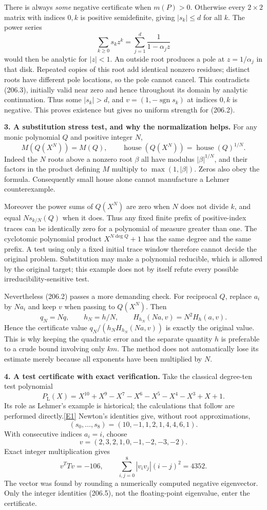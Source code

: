 \documentclass[11pt,a4paper]{article}
\newcommand{\eref}[2]{\hyperlink{extra:#1:#2}{[E#2]}}
\begin{document}
There is always \emph{some} negative certificate when $m(P)>0$.
Otherwise every $2\times2$ matrix with indices $0,k$ is positive
semidefinite, giving $|s_k|\le d$ for all $k$. The power series
\[
 \sum_{k\ge0}s_kz^k=\sum_{j=1}^d\frac{1}{1-\alpha_jz}
 \tag{206.3}
\]
would then be analytic for $|z|<1$. An outside root produces a pole
at $z=1/\alpha_j$ in that disk. Repeated copies of this root add
identical nonzero residues; distinct roots have different pole locations,
so the pole cannot cancel. This contradicts (206.3), initially valid
near zero and hence throughout its domain by analytic continuation.
Thus some $|s_k|>d$, and $v=(1,-\operatorname{sgn}s_k)$ at indices
$0,k$ is negative. This proves existence but gives no uniform strength
for (206.2).

\textbf{3. A substitution stress test, and why the normalization helps.}
For any monic polynomial $Q$ and positive integer $N$,
\[
 M(Q(X^N))=M(Q),\qquad
 \operatorname{house}(Q(X^N))=
 \operatorname{house}(Q)^{1/N}. \tag{206.4}
\]
Indeed the $N$ roots above a nonzero root $\beta$ all have modulus
$|\beta|^{1/N}$, and their factors in the product defining $M$ multiply
to $\max(1,|\beta|)$. Zeros also obey the formula. Consequently small
house alone cannot manufacture a Lehmer counterexample.

Moreover the power sums of $Q(X^N)$ are zero when $N$ does not divide
$k$, and equal $N s_{k/N}(Q)$ when it does. Thus any fixed finite prefix
of positive-index traces can be identically zero for a polynomial of
measure greater than one. The cyclotomic polynomial product
$X^{N\deg Q}+1$ has the same degree and the same prefix. A test using
only a fixed initial trace window therefore cannot decide the original
problem. Substitution may make a polynomial reducible, which is allowed
by the original target; this example does not by itself refute every
possible irreducibility-sensitive test.

Nevertheless (206.2) passes a more demanding check. For reciprocal $Q$,
replace $a_i$ by $Na_i$ and keep $v$ when passing to $Q(X^N)$. Then
\[
 q_N=Nq,\qquad h_N=h/N,\qquad
 H_{h_N}(Na,v)=N^2H_h(a,v).
\]
Hence the certificate value $q_N/(h_NH_{h_N}(Na,v))$ is exactly the
original value. This is why keeping the quadratic error and the separate
quantity $h$ is preferable to a crude bound involving only $km$.
The method does not automatically lose its estimate merely because
all exponents have been multiplied by $N$.

\textbf{4. A test certificate with exact verification.}
Take the classical degree-ten test polynomial
\[
 P_\mathrm L(X)=X^{10}+X^9-X^7-X^6-X^5-X^4-X^3+X+1.
\]
Its role as Lehmer's example is historical; the calculations that follow
are performed directly.\eref{30003556}{1}
Newton's identities give, without root approximations,
\[
 (s_0,\ldots,s_8)=(10,-1,1,2,1,4,4,6,1).
\]
With consecutive indices $a_i=i$, choose
\[
 v=(2,3,2,1,0,-1,-2,-3,-2).
\]
Exact integer multiplication gives
\[
 v^TTv=-106,\qquad
 \sum_{i,j=0}^8|v_iv_j|(i-j)^2=4352. \tag{206.5}
\]
The vector was found by rounding a numerically computed negative
eigenvector. Only the integer identities (206.5), not the floating-point
eigenvalue, enter the certificate.
\end{document}
